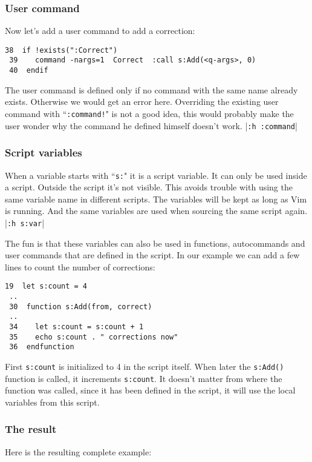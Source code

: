 \subsubsection{User command}
Now let's add a user command to add a correction:

\begin{Verbatim}[samepage=true]
 38  if !exists(":Correct")
 39    command -nargs=1  Correct  :call s:Add(<q-args>, 0)
 40  endif
\end{Verbatim}

The user command is defined only if no command with the same name already exists.
Otherwise we would get an error here.
Overriding the existing user command with ``\texttt{:command!}" is not a good idea, this would probably make the user wonder why the command he defined himself doesn't work.
|\texttt{:h :command}|

\subsubsection{Script variables}
When a variable starts with ``\texttt{s:}" it is a script variable.
It can only be used inside a script.
Outside the script it's not visible.
This avoids trouble with using the same variable name in different scripts.
The variables will be kept as long as Vim is running.
And the same variables are used when sourcing the same script again. |\texttt{:h s:var}|

The fun is that these variables can also be used in functions, autocommands and user commands that are defined in the script.
In our example we can add a few lines to count the number of corrections:

\begin{Verbatim}[samepage=true]
 19  let s:count = 4
 ..
 30  function s:Add(from, correct)
 ..
 34    let s:count = s:count + 1
 35    echo s:count . " corrections now"
 36  endfunction
\end{Verbatim}

First \texttt{s:count} is initialized to 4 in the script itself.
When later the \texttt{s:Add()} function is called, it increments \texttt{s:count}.
It doesn't matter from where the function was called, since it has been defined in the script, it will use the local variables from this script.

\subsubsection{The result}
Here is the resulting complete example:

